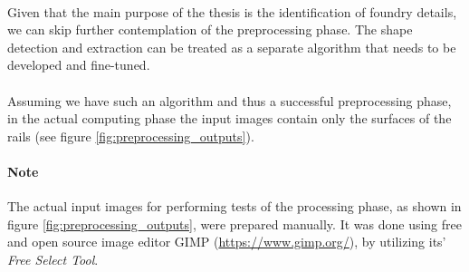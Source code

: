 \paragraph{}
Given that the main purpose of the thesis is the identification of foundry details, we can skip further contemplation of the preprocessing phase. The shape detection and extraction can be treated as a separate algorithm that needs to be developed and fine-tuned.

\paragraph{}
Assuming we have such an algorithm and thus a successful preprocessing phase, in the actual computing phase the input images contain only the surfaces of the rails (see figure \ref{fig:preprocessing_outputs}).

\paragraph{Note}
The actual input images for performing tests of the processing phase, as shown in figure \ref{fig:preprocessing_outputs}, were prepared manually. It was done using free and open source image editor GIMP (\url{https://www.gimp.org/}), by utilizing its' \textit{Free Select Tool}.

